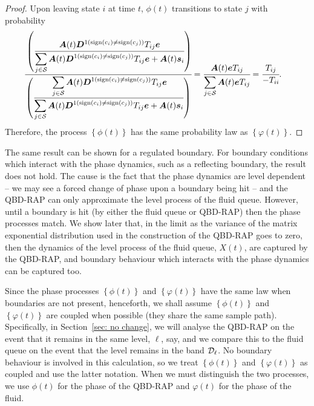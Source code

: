 \begin{proof}
	Upon leaving state \(i\) at time \(t\), \({\phi}(t)\) transitions to state \(j\) with probability 
	\begin{align*}
            	\cfrac{\left(\cfrac{\boldsymbol A(t) \boldsymbol{D}^{1(\mathrm{sign}(c_i)\neq \mathrm{sign}(c_j))}T_{ij}\boldsymbol e}{\displaystyle\sum_{j\in\mathcal S}\boldsymbol A(t) \boldsymbol{D}^{1(\mathrm{sign}(c_i)\neq \mathrm{sign}(c_j))}T_{ij}\boldsymbol e + \boldsymbol A(t) \boldsymbol s_i}\right)}
            	{\left(\cfrac{\displaystyle\sum_{j\in\mathcal S}\boldsymbol A(t) \boldsymbol{D}^{1(\mathrm{sign}(c_i)\neq \mathrm{sign}(c_j))}T_{ij}\boldsymbol e}{\displaystyle\sum_{j\in\mathcal S}\boldsymbol A(t) \boldsymbol{D}^{1(\mathrm{sign}(c_i)\neq \mathrm{sign}(c_j))}T_{ij}\boldsymbol e + \boldsymbol A(t) \boldsymbol s_i}\right)}
            	&=\cfrac{\boldsymbol A(t) \boldsymbol eT_{ij}}
            	{\displaystyle\sum_{j\in\mathcal S}\boldsymbol A(t) \boldsymbol eT_{ij}}
	= \cfrac{T_{ij}}
            	{-T_{ii}}.
	 \end{align*}
	 Therefore, the process \(\left\{{\phi}(t)\right\}\) has the same probability law as \(\left\{\varphi(t)\right\}\).
\end{proof}
\begin{rem}\label{rem: afllflflflf}
The same result can be shown for a regulated boundary. For boundary conditions which interact with the phase dynamics, such as a reflecting boundary, the result does not hold. The cause is the fact that the phase dynamics are level dependent -- we may see a forced change of phase upon a boundary being hit -- and the QBD-RAP can only approximate the level process of the fluid queue. However, until a boundary is hit (by either the fluid queue or QBD-RAP) then the phase processes match. We show later that, in the limit as the variance of the matrix exponential distribution used in the construction of the QBD-RAP goes to zero, then the dynamics of the level process of the fluid queue, \(X(t)\), are captured by the QBD-RAP, and boundary behaviour which interacts with the phase dynamics can be captured too.
\end{rem}

Since the phase processes \(\left\{{\phi}(t)\right\}\) and \(\left\{\varphi(t)\right\}\) have the same law when boundaries are not present, henceforth, we shall assume \(\left\{{\phi}(t)\right\}\) and \(\left\{\varphi(t)\right\}\) are coupled when possible (they share the same sample path). Specifically, in Section~\ref{sec: no change}, we will analyse the QBD-RAP on the event that it remains in the same level, \(\ell\), say, and we compare this to the fluid queue on the event that the level remains in the band \(\mathcal{D}_\ell\). No boundary behaviour is involved in this calculation, so we treat \(\left\{{\phi}(t)\right\}\) and \(\left\{\varphi(t)\right\}\) as coupled and use the latter notation. When we must distinguish the two processes, we use \(\phi(t)\) for the phase of the QBD-RAP and \(\varphi(t)\) for the phase of the fluid. 


